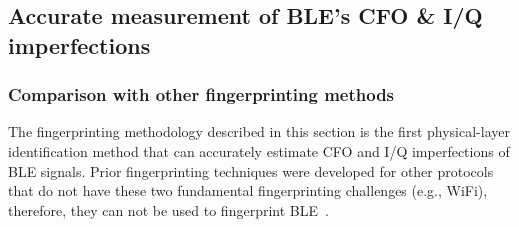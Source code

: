 




\subsection{Accurate measurement of BLE's CFO \& I/Q imperfections} %
\label{sec:methodology1}


\subsubsection*{Comparison with other fingerprinting methods}

The fingerprinting methodology described in this section is the first
physical-layer identification method that can accurately estimate CFO and I/Q
imperfections of BLE signals.
%
Prior fingerprinting techniques
were developed for other protocols that do not have these two fundamental fingerprinting challenges (e.g., WiFi), 
therefore, they can not be used to fingerprint BLE~\cite{vohuuusrp,Brik_radiometric,deviceID_kose,Intrusion_hall,suskitransient,deeplearning_merchant,lora_robyns,gopalakrishnan2019robust}.

